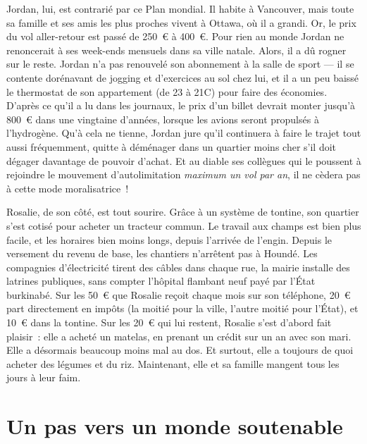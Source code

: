 \documentclass[a5paper,french,openany]{memoir}
\begin{document}
Jordan, lui, est contrarié par ce Plan mondial. Il habite à Vancouver, mais toute sa famille et ses amis les plus proches vivent à Ottawa, où il a grandi. Or, le prix du vol aller-retour est passé de 250~\euro{} à 400~\euro{}. Pour rien au monde Jordan ne renoncerait à ses week-ends mensuels dans sa ville natale. Alors, il a dû rogner sur le reste. Jordan n'a pas renouvelé son abonnement à la salle de sport --- il se contente dorénavant de jogging et d'exercices au sol chez lui, et il a un peu baissé le thermostat de son appartement (de 23 à 21\textdegree{}C) pour faire des économies. D'après ce qu'il a lu dans les journaux, le prix d'un billet devrait monter jusqu'à 800~\euro{} dans une vingtaine d'années, lorsque les avions seront propulsés à l'hydrogène. Qu'à cela ne tienne, Jordan jure qu'il continuera à faire le trajet tout aussi fréquemment, quitte à déménager dans un quartier moins cher s'il doit dégager davantage de pouvoir d'achat. Et au diable ses collègues qui le poussent à rejoindre le mouvement d'autolimitation \textit{maximum un vol par an}, il ne cèdera pas à cette mode moralisatrice~!

Rosalie, de son côté, est tout sourire. Grâce à un système de tontine, son quartier s'est cotisé pour acheter un tracteur commun. Le travail aux champs est bien plus facile, et les horaires bien moins longs, depuis l'arrivée de l'engin. Depuis le versement du revenu de base, les chantiers n'arrêtent pas à Houndé. Les compagnies d'électricité tirent des câbles dans chaque rue, la mairie installe des latrines publiques, sans compter l'hôpital flambant neuf payé par l'État burkinabé. Sur les 50~\euro{} que Rosalie reçoit chaque mois sur son téléphone, 20~\euro{} part directement en impôts (la moitié pour la ville, l'autre moitié pour l'État), et 10~\euro{} %
dans la tontine. Sur les 20~\euro{} qui lui restent, Rosalie s'est d'abord fait plaisir~: elle a acheté un matelas, en prenant un crédit sur un an avec son mari. Elle a désormais beaucoup moins mal au dos. Et surtout, elle a toujours de quoi acheter des légumes et du riz. Maintenant, elle et sa famille mangent tous les jours à leur faim.


\chapter{Un pas vers un monde soutenable\label{ch:premier_pas}} %
\end{document}

